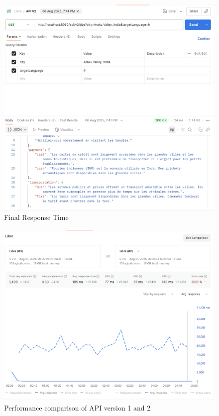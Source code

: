 \begin{figure}[H]
    \centering
    \includegraphics[width=0.6\linewidth]{images/Backend/Translation_Service_final_iteration.png}
    \caption{Final Response Time}
    \label{fig:final_response_time}
\end{figure}

\begin{figure}[H]
    \centering
    \includegraphics[width=0.6\linewidth]{images/Backend/Performance_Comparision.png}
    \caption{Performance comparison of API version 1 and 2}
    \label{fig:perf_comp}
\end{figure}